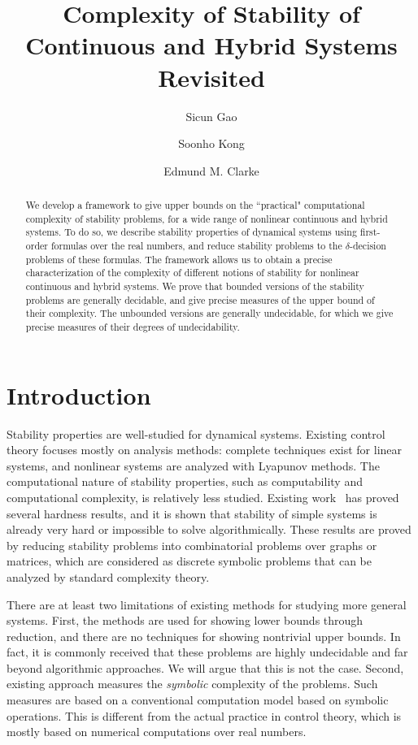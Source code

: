 \documentclass[10pt]{article}
\title{\LARGE \bf Complexity of Stability of Continuous and Hybrid Systems Revisited}
\author{Sicun Gao \and Soonho Kong \and Edmund M. Clarke}
\theoremstyle{plain}
\theoremstyle{definition}
\begin{document}
\maketitle
\thispagestyle{empty}
\pagestyle{empty}


\begin{abstract}
We develop a framework to give upper bounds on the ``practical" computational complexity of stability problems, for a wide range of nonlinear continuous and hybrid systems. To do so, we describe stability properties of dynamical systems using first-order formulas over the real numbers, and reduce stability problems to the $\delta$-decision problems of these formulas. The framework allows us to obtain a precise characterization of the complexity of different notions of stability for nonlinear continuous and hybrid systems. We prove that bounded versions of the stability problems are generally decidable, and give precise measures of the upper bound of their complexity. The unbounded versions are generally undecidable, for which we give precise measures of their degrees of undecidability. 
\end{abstract}

\section{Introduction}

Stability properties are well-studied for dynamical systems. Existing control theory focuses mostly on analysis methods: complete techniques exist for linear systems, and nonlinear systems are analyzed with Lyapunov methods. The computational nature of stability properties, such as computability and computational complexity, is relatively less studied. Existing work~\cite{DBLP:journals/automatica/BlondelT99,DBLP:journals/automatica/BlondelT00,DBLP:conf/hybrid/PrabhakarV13} has proved several hardness results, and it is shown that stability of simple systems is already very hard or impossible to solve algorithmically. These results are proved by reducing stability problems into combinatorial problems over graphs or matrices, which are considered as discrete symbolic problems that can be analyzed by standard complexity theory. 

There are at least two limitations of existing methods for studying more general systems. First, the methods are used for showing lower bounds through reduction, and there are no techniques for showing nontrivial upper bounds. In fact, it is commonly received that these problems are highly undecidable and far beyond algorithmic approaches. We will argue that this is not the case. Second, existing approach measures the {\em symbolic} complexity of the problems. Such measures are based on a conventional computation model based on symbolic operations. This is different from the actual practice in control theory, which is mostly based on numerical computations over real numbers. 
\end{document}
